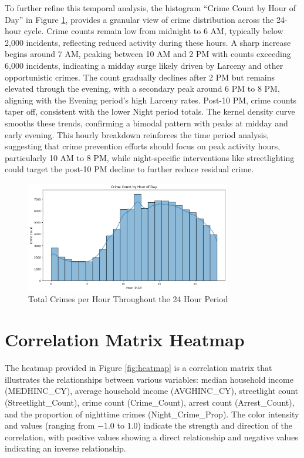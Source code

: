 \documentclass{report}
\begin{document}
\newpage
\par To further refine this temporal analysis, the histogram “Crime Count by Hour of Day” in Figure \ref{fig:crime-by-hour}, provides a granular view of crime distribution across the 24-hour cycle. Crime counts remain low from midnight to 6 AM, typically below 2,000 incidents, reflecting reduced activity during these hours. A sharp increase begins around 7 AM, peaking between 10 AM and 2 PM with counts exceeding 6,000 incidents, indicating a midday surge likely driven by Larceny and other opportunistic crimes. The count gradually declines after 2 PM but remains elevated through the evening, with a secondary peak around 6 PM to 8 PM, aligning with the Evening period’s high Larceny rates. Post-10 PM, crime counts taper off, consistent with the lower Night period totals. The kernel density curve smooths these trends, confirming a bimodal pattern with peaks at midday and early evening. This hourly breakdown reinforces the time period analysis, suggesting that crime prevention efforts should focus on peak activity hours, particularly 10 AM to 8 PM, while night-specific interventions like streetlighting could target the post-10 PM decline to further reduce residual crime.

\begin{figure}[htbp]
  \centering
  \includegraphics[width=0.8\textwidth]{crime-by-hour.png}
  \caption{Total Crimes per Hour Throughout the 24 Hour Period}
  \label{fig:crime-by-hour}
\end{figure}

\newpage
\section{Correlation Matrix Heatmap}
\par The heatmap provided in Figure \ref{fig:heatmap} is a correlation matrix that illustrates the relationships between various variables: median household income (MEDHINC\_CY), average household income (AVGHINC\_CY), streetlight count (Streetlight\_Count), crime count (Crime\_Count), arrest count (Arrest\_Count), and the proportion of nighttime crimes (Night\_Crime\_Prop). The color intensity and values (ranging from $-1.0$ to $1.0$) indicate the strength and direction of the correlation, with positive values showing a direct relationship and negative values indicating an inverse relationship.
\end{document}
